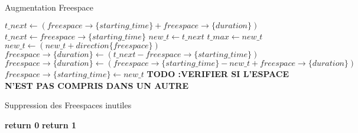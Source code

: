 \documentclass{report}
\begin{document}
\begin{algorithm}
\caption{Augmentation Freespace}\label{extend_freespace}
\begin{algorithmic}[1]
	\State
		\State $t\_next \gets (freespace\rightarrow\{starting\_time\} + freespace\rightarrow\{duration\} )$
	\Else
		\State $t\_next \gets freespace\rightarrow\{starting\_time\} $
	\EndIf
	\State
	\State $new\_t \gets t\_next$
		\State $t\_max \gets new\_t$
		\State $new\_t \gets (new\_t + direction\{freespace\})$
	\EndWhile
	\State
		\State $freespace\rightarrow\{duration\} \gets (t\_next - freespace\rightarrow\{starting\_time\})$
	\Else
		\State $freespace\rightarrow\{duration\} \gets (freespace\rightarrow\{starting\_time\} - new\_t + freespace\rightarrow\{duration\})$
		\State $freespace\rightarrow\{starting\_time\} \gets new\_t$
	\EndIf
	\State
	\State \textbf{TODO :VERIFIER SI L'ESPACE N'EST PAS COMPRIS DANS UN AUTRE}
\EndFunction
\end{algorithmic}
\end{algorithm}

\begin{algorithm}
\caption{Suppression des Freespaces inutiles}\label{is_necessary_freespace}
\begin{algorithmic}[1]
	\State
					\State \textbf{return 0}
				\EndIf
			\EndIf
		\EndIf
	\EndFor
	\State \textbf{return 1}
\EndFunction
\end{algorithmic}
\end{algorithm}
\end{document}
